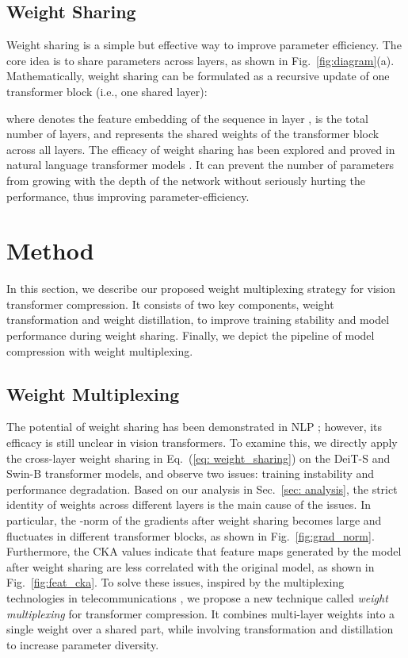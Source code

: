 \documentclass[10pt,twocolumn,letterpaper]{article}
\begin{document}
\subsection{Weight Sharing}
    
    Weight sharing is a simple but effective way to improve parameter efficiency. The core idea is to share parameters across layers, as shown in Fig.~\ref{fig:diagram}(a). Mathematically, weight sharing can be formulated as a recursive update of one transformer block   (i.e., one shared layer):
    
    where  denotes the feature embedding of the sequence in layer ,  is the total number of layers, and  represents the shared weights of the transformer block across all layers. The efficacy of weight sharing has been explored and proved in natural language transformer models \cite{DEQ, UniTransformer, Albert}.  It can prevent the number of parameters from growing with the depth of the  network without seriously hurting the performance, thus improving parameter-efficiency.
    
\section{Method}

In this section, we describe our proposed weight multiplexing strategy for vision transformer compression. It consists of two key components, weight transformation and weight distillation, to improve training stability and model performance during weight sharing. Finally, we depict the pipeline of model compression with weight multiplexing.

\subsection{Weight Multiplexing}
\label{sec: wm}

The potential of weight sharing has been demonstrated in NLP \cite{Albert, DEQ, UniTransformer}; however, its efficacy is still unclear in vision transformers. 
To examine this, we directly apply the cross-layer weight sharing in Eq.~(\ref{eq: weight_sharing}) on the DeiT-S \cite{deit} and Swin-B \cite{Swin} transformer models, and observe two issues: training instability and performance degradation. Based on our analysis in Sec.~\ref{sec: analysis}, the strict identity of weights across different layers is the main cause of the issues. In particular, the -norm of the gradients after weight sharing becomes large and fluctuates in different transformer blocks, as shown in Fig.~\ref{fig:grad_norm}. Furthermore, the CKA values indicate that feature maps generated by the model after weight sharing are less correlated with the original model, as shown in Fig.~\ref{fig:feat_cka}. To solve these issues, inspired by the multiplexing technologies in telecommunications \cite{wiki:multiplexing, cdm}, we propose a new technique called \emph{weight multiplexing} for transformer compression. It combines multi-layer weights into a single weight over a shared part, while involving transformation and distillation to increase parameter diversity. 
\end{document}
